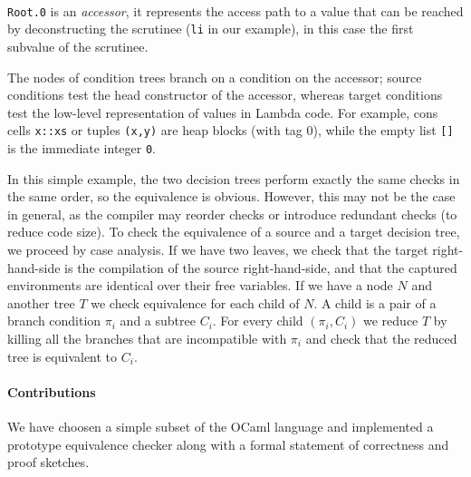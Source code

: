 \documentclass[12pt]{article}
\begin{document}
~

\texttt{Root.0} is an \emph{accessor}, it represents the
access path to a value that can be reached by deconstructing the
scrutinee (\texttt{li} in our example), in this case the first
subvalue of the scrutinee.

The nodes of condition trees branch on a condition on the accessor;
source conditions test the head constructor of the accessor, whereas
target conditions test the low-level representation of values in
Lambda code. For example, cons cells \texttt{x::xs} or tuples
\texttt{(x,y)} are heap blocks (with tag 0), while the empty list
\texttt{[]} is the immediate integer \texttt{0}.

In this simple example, the two decision trees perform exactly the
same checks in the same order, so the equivalence is obvious. However,
this may not be the case in general, as the compiler may reorder
checks or introduce redundant checks (to reduce code size).
%
To check the equivalence of a source and a target decision tree,
we proceed by case analysis.
%
If we have two leaves, we check that the target right-hand-side is the
compilation of the source right-hand-side, and that the captured
environments are identical over their free variables.
%
If we have a node $N$ and another tree $T$ we check equivalence for
each child of $N$. A child is a pair of a branch condition $\pi_i$ and a
subtree $C_i$. For every child $(\pi_i, C_i)$ we reduce $T$ by killing all
the branches that are incompatible with $\pi_i$ and check that the
reduced tree is equivalent to $C_i$.

\paragraph{Contributions} We have choosen a simple subset of the OCaml
language and implemented a prototype equivalence checker along with
a formal statement of correctness and proof sketches.
\end{document}
